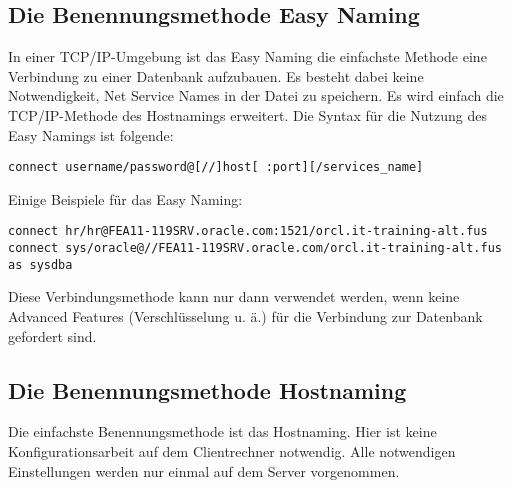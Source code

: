       \subsection{Die Benennungsmethode Easy Naming}
        In einer TCP/IP-Umgebung ist das Easy Naming die einfachste Methode eine Verbindung zu einer Datenbank aufzubauen. Es besteht dabei keine Notwendigkeit, Net Service Names in der Datei  zu speichern. Es wird einfach die TCP/IP-Methode des Hostnamings erweitert. Die Syntax für die Nutzung des Easy Namings ist folgende:
        \begin{lstlisting}[caption={Easy Naming},label=admin606,language=terminal]
connect username/password@[//]host[ :port][/services_name]
        \end{lstlisting}
        Einige Beispiele für das Easy Naming:
        \begin{lstlisting}[caption={Beispiele für Easy Naming},label=admin607,language=terminal]
connect hr/hr@FEA11-119SRV.oracle.com:1521/orcl.it-training-alt.fus
connect sys/oracle@//FEA11-119SRV.oracle.com/orcl.it-training-alt.fus as sysdba
        \end{lstlisting}
        \begin{merke}
          Diese Verbindungsmethode kann nur dann verwendet werden, wenn keine Advanced Features (Verschlüsselung u. ä.) für die Verbindung zur Datenbank gefordert sind.
        \end{merke}
        \begin{literaturinternet}
          \item \cite{i507143}
        \end{literaturinternet}
      \subsection{Die Benennungsmethode Hostnaming}
        Die einfachste Benennungsmethode ist das Hostnaming. Hier ist keine Konfigurationsarbeit auf dem Clientrechner notwendig. Alle notwendigen Einstellungen werden nur einmal auf dem Server vorgenommen.

